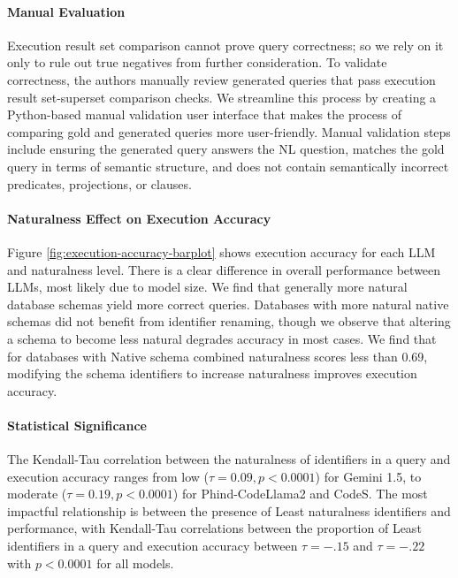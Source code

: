 \paragraph{\textbf{Manual Evaluation}}
Execution result set comparison cannot prove query correctness; so we rely on it only to rule out true negatives from further consideration.
To validate correctness, the authors manually review generated queries that pass execution result set-superset comparison checks.
We streamline this process by creating a Python-based manual validation user interface that makes the process of comparing gold and generated queries more user-friendly.
Manual validation steps include ensuring the generated query answers the NL question, matches the gold query in terms of semantic structure, and does not contain semantically incorrect predicates, projections, or clauses.

\paragraph{\textbf{Naturalness Effect on Execution Accuracy}}

Figure \ref{fig:execution-accuracy-barplot} shows execution accuracy for each LLM and naturalness level.
There is a clear difference in overall performance between LLMs, most likely due to model size.
We find that generally more natural database schemas yield more correct queries.
Databases with more natural native schemas did not benefit from identifier renaming, though we observe that altering a schema to become less natural degrades accuracy in most cases. We find that for databases with Native schema combined naturalness scores less than 0.69, modifying the schema identifiers to increase naturalness improves execution accuracy.

\paragraph{\textbf{Statistical Significance}}
The Kendall-Tau correlation between the naturalness of identifiers in a query and execution accuracy ranges from low ($\tau = 0.09, p < 0.0001$) for Gemini 1.5, to moderate ($\tau = 0.19, p < 0.0001$) for Phind-CodeLlama2 and CodeS.
The most impactful relationship is between the presence of Least naturalness identifiers and performance, with Kendall-Tau correlations between the proportion of Least  identifiers in a query and execution accuracy between $\tau=-.15$ and $\tau=-.22$ with $p < 0.0001$ for all models.

